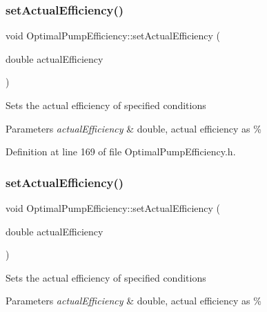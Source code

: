 \subsubsection{\texorpdfstring{set\+Actual\+Efficiency()}{setActualEfficiency()}\hspace{0.1cm}{\footnotesize\ttfamily [1/3]}}
{\footnotesize\ttfamily void Optimal\+Pump\+Efficiency\+::set\+Actual\+Efficiency (\begin{DoxyParamCaption}\item[{double}]{actual\+Efficiency }\end{DoxyParamCaption})\hspace{0.3cm}{\ttfamily [inline]}}

Sets the actual efficiency of specified conditions 
\begin{DoxyParams}{Parameters}
{\em actual\+Efficiency} & double, actual efficiency as \% \\
\hline
\end{DoxyParams}


Definition at line 169 of file Optimal\+Pump\+Efficiency.\+h.

\mbox{\label{class_optimal_pump_efficiency_a539b20c53c7ba6a5983a60d74be4ac9e}} 
\subsubsection{\texorpdfstring{set\+Actual\+Efficiency()}{setActualEfficiency()}\hspace{0.1cm}{\footnotesize\ttfamily [2/3]}}
{\footnotesize\ttfamily void Optimal\+Pump\+Efficiency\+::set\+Actual\+Efficiency (\begin{DoxyParamCaption}\item[{double}]{actual\+Efficiency }\end{DoxyParamCaption})\hspace{0.3cm}{\ttfamily [inline]}}

Sets the actual efficiency of specified conditions 
\begin{DoxyParams}{Parameters}
{\em actual\+Efficiency} & double, actual efficiency as \% \\
\hline
\end{DoxyParams}



